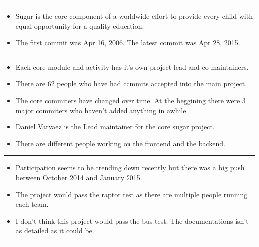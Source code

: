\begin{center}\rule{3in}{0.4pt}\end{center}

\begin{itemize}
\itemsep1pt\parskip0pt
\item
  Sugar is the core component of a worldwide effort to provide every
  child with equal opportunity for a quality education.
\item
  The first commit was Apr 16, 2006. The latest commit was Apr 28, 2015.
\end{itemize}

\begin{center}\rule{3in}{0.4pt}\end{center}

\begin{itemize}
\itemsep1pt\parskip0pt
\item
  Each core module and activity has it's own project lead and
  co-maintainers.
\item
  There are 62 people who have had commits accepted into the main
  project.
\item
  The core commiters have changed over time. At the beggining there were
  3 major commiters who haven't added anything in awhile.
\item
  Daniel Varvaez is the Lead maintainer for the core sugar project.
\item
  There are different people working on the frontend and the backend.
\end{itemize}

\begin{center}\rule{3in}{0.4pt}\end{center}

\begin{itemize}
\itemsep1pt\parskip0pt
\item
  Participation seems to be trending down recently but there was a big
  push between October 2014 and January 2015.
\item
  The project would pass the raptor test as there are multiple people
  running each team.
\item
  I don't think this project would pass the bus test. The documentations
  isn't as detailed as it could be.
\end{itemize}

\begin{center}\rule{3in}{0.4pt}\end{center}

